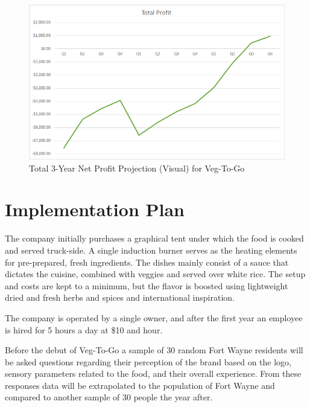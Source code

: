 \documentclass[12pt, letterpaper]{article}
\newcommand{\companyname}{Veg-To-Go}
\begin{document}
\begin{figure}[H]
	\caption{Total 3-Year Net Profit Projection (Visual) for \companyname{}}
	\includegraphics[width=\textwidth]{TotalProfit}
\end{figure}

\newpage

\section{Implementation Plan}
The company initially purchases a graphical tent under which the food is cooked and served truck-side.  A single induction burner serves as the heating elements for pre-prepared, fresh ingredients.  The dishes mainly consist of a sauce that dictates the cuisine, combined with veggies and served over white rice.  The setup and costs are kept to a minimum, but the flavor is boosted using lightweight dried and fresh herbs and spices and international inspiration.

The company is operated by a single owner, and after the first year an employee is hired for 5 hours a day at \$10 and hour.

Before the debut of \companyname{} a sample of 30 random Fort Wayne residents will be asked questions regarding their perception of the brand based on the logo, sensory parameters related to the food, and their overall experience.  From these responses data will be extrapolated to the population of Fort Wayne and compared to another sample of 30 people the year after.

\newpage
\end{document}
